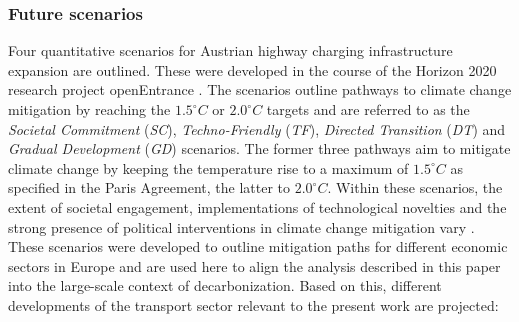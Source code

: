 \documentclass[journal,article,submit,pdftex,moreauthors]{Definitions/mdpi}
\begin{document}
    \subsubsection{Future scenarios}
    Four quantitative scenarios for Austrian highway charging infrastructure expansion are outlined. These were developed in the course of the Horizon 2020 research project openEntrance \citep[][]{openentrance}. The scenarios outline pathways to climate change mitigation by reaching the $1.5^{\circ}C$ or $2.0^{\circ}C$ targets and are referred to as the \textit{Societal Commitment} (\textit{SC}), \textit{Techno-Friendly} (\textit{TF}), \textit{Directed Transition} (\textit{DT}) and \textit{Gradual Development} (\textit{GD}) scenarios. The former three pathways aim to mitigate climate change by keeping the temperature rise to a maximum of $1.5^{\circ}C$ as specified in the Paris Agreement, the latter to $2.0^{\circ}C$. Within these scenarios, the extent of societal engagement, implementations of technological novelties and the strong presence of political interventions in climate change mitigation vary \citep[see also][]{Auer2019, HAINSCH2022122067}. These scenarios were developed to outline mitigation paths for different economic sectors in Europe and are used here to align the analysis described in this paper into the large-scale context of decarbonization. Based on this, different developments of the transport sector relevant to the present work are projected:
\end{document}
